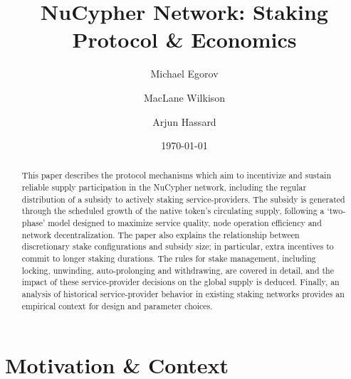 \documentclass[longbibliography,nofootinbib]{revtex4-1}
\begin{document}
\title{NuCypher Network: Staking Protocol \& Economics}

\author{Michael Egorov}
\author{MacLane Wilkison}
\author{Arjun Hassard}

\begin{abstract}
This paper describes the protocol mechanisms which aim to incentivize and sustain reliable supply participation in the NuCypher network, including the regular distribution of a subsidy to actively staking service-providers. The subsidy is generated through the scheduled growth of the native token's circulating supply, following a `two-phase' model designed to maximize service quality, node operation efficiency and network decentralization. The paper also explains the relationship between discretionary stake configurations and subsidy size; in particular, extra incentives to commit to longer staking durations. The rules for stake management, including locking, unwinding, auto-prolonging and withdrawing, are covered in detail, and the impact of these service-provider decisions on the global supply is deduced. Finally, an analysis of historical service-provider behavior in existing staking networks provides an empirical context for design and parameter choices.
\end{abstract}

\date{\today}
\maketitle

\section{Motivation \& Context}
\end{document}
